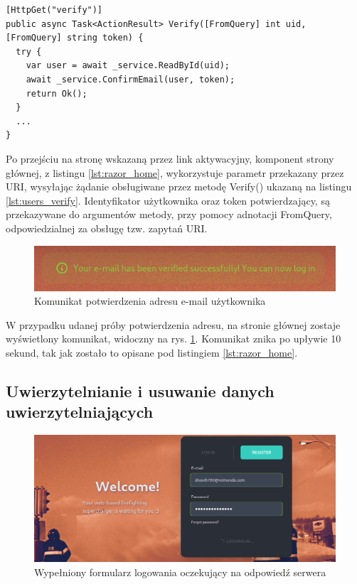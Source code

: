 \begin{lstlisting}[language=CSharp, caption={Metoda kontrolera użytkowników, weryfikująca adres e-mail użytkownika}, label=lst:users_verify]
[HttpGet("verify")]
public async Task<ActionResult> Verify([FromQuery] int uid, [FromQuery] string token) {
  try {
    var user = await _service.ReadById(uid);
    await _service.ConfirmEmail(user, token);
    return Ok();
  }
  ...
}
\end{lstlisting}
 
Po przejściu na stronę wskazaną przez link aktywacyjny, komponent strony głównej, z listingu \ref{lst:razor_home}, wykorzystuje parametr przekazany przez URI, wysyłając żądanie obsługiwane przez metodę Verify() ukazaną na listingu \ref{lst:users_verify}. Identyfikator użytkownika oraz token potwierdzający, są przekazywane do argumentów metody, przy pomocy adnotacji FromQuery, odpowiedzialnej za obsługę tzw. zapytań URI.

\begin{figure}[!htbp]
\centering
\includegraphics[width=\textwidth]{img/chapter5/confirmed.png}
\caption{Komunikat potwierdzenia adresu e-mail użytkownika}
\label{fig:confirmation}
\end{figure}

W przypadku udanej próby potwierdzenia adresu, na stronie głównej zostaje wyświetlony komunikat, widoczny na rys. \ref{fig:confirmation}. Komunikat znika po upływie 10 sekund, tak jak zostało to opisane pod listingiem \ref{lst:razor_home}.

\subsection{Uwierzytelnianie i usuwanie danych uwierzytelniających}

\begin{figure}[!htbp]
\centering
\includegraphics[width=\textwidth]{img/chapter5/login.png}
\caption{Wypełniony formularz logowania oczekujący na odpowiedź serwera}
\label{fig:form_login}
\end{figure}

